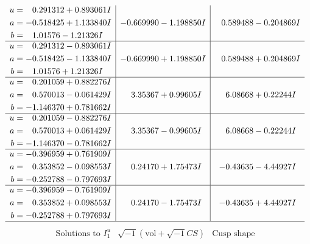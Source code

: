\documentclass[1p]{elsarticle_modified}
\theoremstyle{definition}
\newcommand{\I}{\sqrt{-1}}
\begin{document}
$$\begin{array}{c|c|c}
\begin{aligned}
u &= \phantom{-}0.291312 + 0.893061 I \\
a &= -0.518425 + 1.133840 I \\
b &= \phantom{-}1.01576 - 1.21326 I\end{aligned}
 & -0.669990 - 1.198850 I & \phantom{-}0.589488 - 0.204869 I \\ \hline\begin{aligned}
u &= \phantom{-}0.291312 - 0.893061 I \\
a &= -0.518425 - 1.133840 I \\
b &= \phantom{-}1.01576 + 1.21326 I\end{aligned}
 & -0.669990 + 1.198850 I & \phantom{-}0.589488 + 0.204869 I \\ \hline\begin{aligned}
u &= \phantom{-}0.201059 + 0.882276 I \\
a &= \phantom{-}0.570013 - 0.061429 I \\
b &= -1.146370 + 0.781662 I\end{aligned}
 & \phantom{-}3.35367 + 0.99605 I & \phantom{-}6.08668 + 0.22244 I \\ \hline\begin{aligned}
u &= \phantom{-}0.201059 - 0.882276 I \\
a &= \phantom{-}0.570013 + 0.061429 I \\
b &= -1.146370 - 0.781662 I\end{aligned}
 & \phantom{-}3.35367 - 0.99605 I & \phantom{-}6.08668 - 0.22244 I \\ \hline\begin{aligned}
u &= -0.396959 + 0.761909 I \\
a &= \phantom{-}0.353852 - 0.098553 I \\
b &= -0.252788 - 0.797693 I\end{aligned}
 & \phantom{-}0.24170 + 1.75473 I & -0.43635 - 4.44927 I \\ \hline\begin{aligned}
u &= -0.396959 - 0.761909 I \\
a &= \phantom{-}0.353852 + 0.098553 I \\
b &= -0.252788 + 0.797693 I\end{aligned}
 & \phantom{-}0.24170 - 1.75473 I & -0.43635 + 4.44927 I\\
 \hline 
 \end{array}$$\newpage$$\begin{array}{c|c|c}  
\text{Solutions to }I^u_{1}& \I (\text{vol} + \sqrt{-1}CS) & \text{Cusp shape}\\

\end{array}$$
\end{document}
